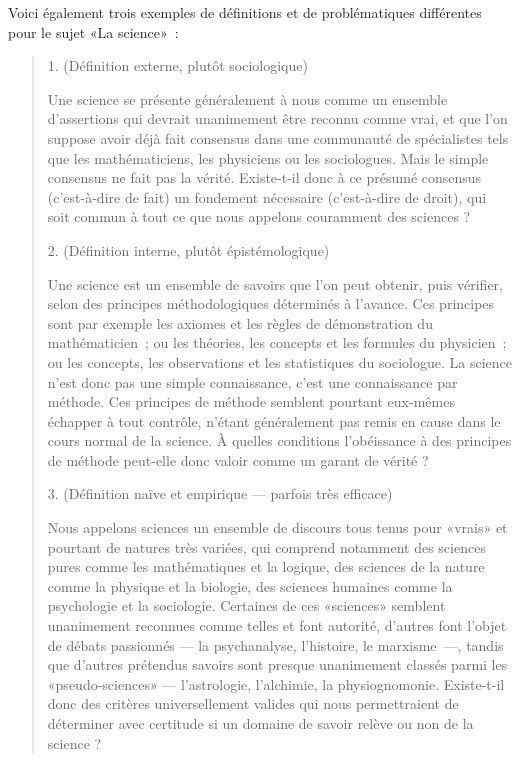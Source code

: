 \documentclass[a4paper,11pt]{article}
\begin{document}
Voici également trois exemples de définitions et de problématiques
différentes pour le sujet «La science»~:

\begin{quote}
  1. (Définition externe, plutôt sociologique)

Une science se présente généralement à nous comme un ensemble
d'assertions qui devrait unanimement être reconnu comme vrai, et que
l'on suppose avoir déjà fait consensus dans une communauté de
spécialistes tels que les mathématiciens, les physiciens ou les
sociologues. Mais le simple consensus ne fait pas la vérité. Existe-t-il
donc à ce présumé consensus (c'est-à-dire de fait) un fondement
nécessaire (c'est-à-dire de droit), qui soit commun à tout ce que nous
appelons couramment des sciences ?


2. (Définition interne, plutôt épistémologique)

Une science est un ensemble de savoirs que l'on peut obtenir, puis
vérifier, selon des principes méthodologiques déterminés à l'avance. Ces
principes sont par exemple les axiomes et les règles de démonstration du
mathématicien~; ou les théories, les concepts et les formules du
physicien~; ou les concepts, les observations et les statistiques du
sociologue. La science n'est donc pas une simple connaissance, c'est une
connaissance par méthode. Ces principes de méthode semblent pourtant
eux-mêmes échapper à tout contrôle, n'étant généralement pas remis en
cause dans le cours normal de la science. À quelles conditions
l'obéissance à des principes de méthode peut-elle donc valoir comme un
garant de vérité ?


3. (Définition naïve et empirique — parfois très efficace)

Nous appelons sciences un ensemble de discours tous tenus pour «vrais»
et pourtant de natures très variées, qui comprend notamment des sciences
pures comme les mathématiques et la logique, des sciences de la nature
comme la physique et la biologie, des sciences humaines comme la
psychologie et la sociologie. Certaines de ces «sciences» semblent
unanimement reconnues comme telles et font autorité, d'autres font
l'objet de débats passionnés — la psychanalyse, l'histoire, le
marxisme~—, tandis que d'autres prétendus savoirs sont presque
unanimement classés parmi les «pseudo-sciences» — l'astrologie,
l'alchimie, la physiognomonie. Existe-t-il donc des critères
universellement valides qui nous permettraient de déterminer avec
certitude si un domaine de savoir relève ou non de la science ?
\end{quote}
\end{document}
